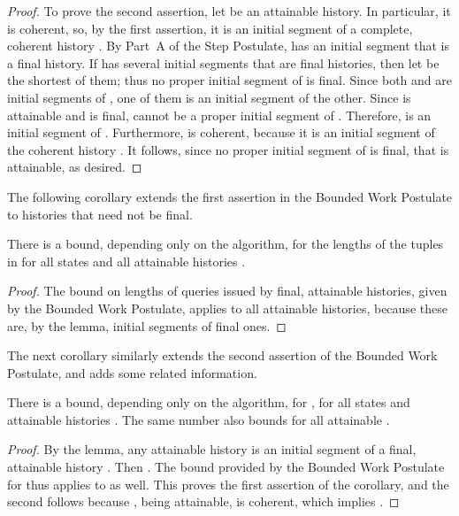\documentclass{LMCS}
\theoremstyle{definition}
\begin{document}
\begin{proof}
To prove the second assertion, let  be an attainable history.  In
particular, it is coherent, so, by the first assertion, it is an
initial segment of a complete, coherent history .  By Part~A of
the Step Postulate,  has an initial segment  that is a
final history.  If  has several initial segments that are final
histories, then let  be the shortest of them; thus no proper
initial segment of  is final.  Since both  and  are
initial segments of , one of them is an initial segment of the
other.  Since  is attainable and  is final,  cannot
be a proper initial segment of .  Therefore,  is an initial
segment of .  Furthermore,  is coherent, because it is an
initial segment of the coherent history .  It follows, since no
proper initial segment of  is final, that  is attainable,
as desired.
\end{proof}

The following corollary extends the first assertion in the Bounded
Work Postulate to histories that need not be final.

\begin{cor}  \label{bd-query}
  There is a bound, depending only on the algorithm, for the lengths
    of the tuples in  for all states  and all
    attainable histories .
\end{cor}

\begin{proof}
  The bound on lengths of queries issued by final, attainable
  histories, given by the Bounded Work Postulate, applies to all
  attainable histories, because these are, by the lemma, initial
  segments of final ones.
\end{proof}

The next corollary similarly extends the second assertion of the
Bounded Work Postulate, and adds some related information.

\begin{cor}  \label{bd-dom}
  There is a bound, depending only on the algorithm, for
    , for all states  and attainable
    histories .  The same number also bounds  for all
    attainable .
\end{cor}

\begin{proof}
  By the lemma, any attainable history  is an initial segment of
  a final, attainable history .  Then .  The bound provided by the
  Bounded Work Postulate for  thus applies
  to  as well.  This proves the first assertion of the corollary,
  and the second follows because , being attainable, is coherent,
  which implies .
\end{proof}
\end{document}
